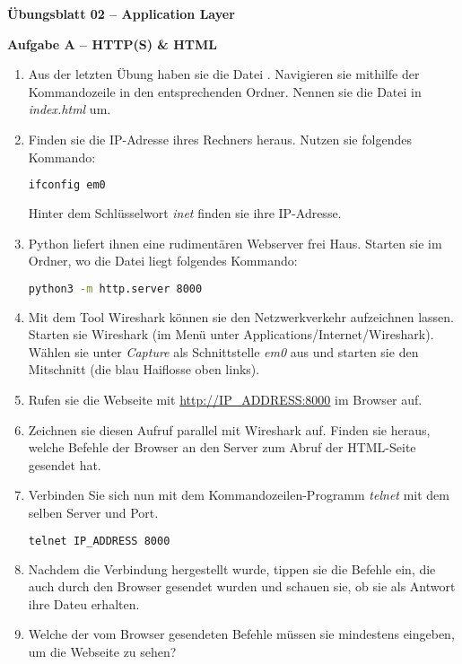 \documentclass[paper=a4,fontsize=11pt]{scrartcl}%
\numberwithin{equation}{section}
\begin{document}
\begin{center}
\Large{\textbf{Übungsblatt 02 --  Application Layer}}
\end{center}

\begin{center}\Large{\textbf{Aufgabe A -- HTTP(S) \& HTML}}\end{center}\vskip0.25in
\begin{enumerate}
	\item Aus der letzten Übung haben sie die Datei . Navigieren sie mithilfe der Kommandozeile in den entsprechenden Ordner. Nennen sie die Datei in \emph{index.html} um.
	\item Finden sie die IP-Adresse ihres Rechners heraus. Nutzen sie folgendes Kommando:
		\begin{lstlisting}[style=Bash, language=Bash]
ifconfig em0
\end{lstlisting}
		Hinter dem Schlüsselwort \emph{inet} finden sie ihre IP-Adresse.
	\item Python liefert ihnen eine rudimentären Webserver frei Haus. Starten sie im Ordner, wo die  Datei liegt folgendes Kommando:
		\begin{lstlisting}[style=Bash, language=Bash]
python3 -m http.server 8000
		\end{lstlisting}
	\item Mit dem Tool Wireshark können sie den Netzwerkverkehr aufzeichnen lassen. Starten sie Wireshark (im Menü unter Applications/Internet/Wireshark). Wählen sie unter \emph{Capture} als Schnittstelle \emph{em0} aus und starten sie den Mitschnitt (die blau Haiflosse oben links).
	\item Rufen sie die Webseite mit \url{http://IP_ADDRESS:8000} im Browser auf.
	\item Zeichnen sie diesen Aufruf parallel mit Wireshark auf. Finden sie heraus, welche Befehle der Browser an den Server zum  Abruf der HTML-Seite gesendet hat.
	\item Verbinden Sie sich nun mit dem Kommandozeilen-Programm \emph{telnet} mit dem selben Server und Port.	
	\begin{lstlisting}[style=Bash, language=Bash]
telnet IP_ADDRESS 8000
\end{lstlisting}
	\item Nachdem die Verbindung hergestellt wurde, tippen sie die Befehle ein, die auch durch den Browser gesendet wurden und schauen sie, ob sie als Antwort ihre  Dateu erhalten.
	\item Welche der vom Browser gesendeten Befehle müssen sie mindestens eingeben, um die Webseite zu sehen?

\end{enumerate}
\end{document}
